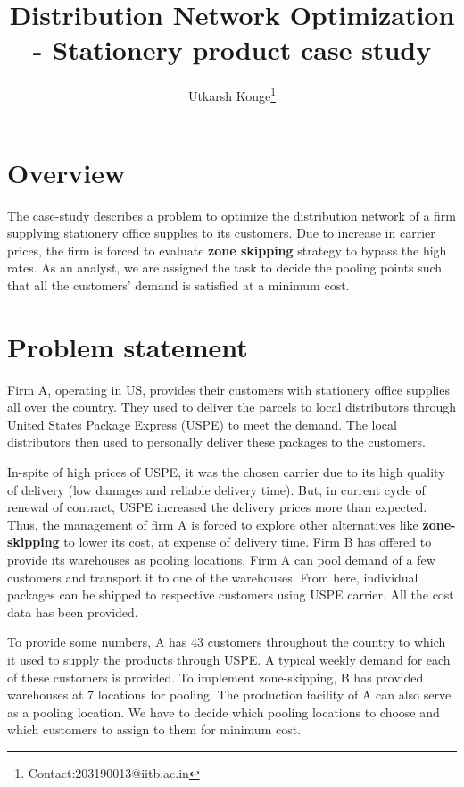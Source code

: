 \documentclass[11pt]{article}
\begin{document}
 
 
\title{Distribution Network Optimization - Stationery product case study }
\author{Utkarsh Konge\footnote{Contact:203190013@iitb.ac.in}}
\date{}
\maketitle

\section{Overview}
The case-study \cite{drake2011case} describes a problem to optimize the distribution network of a firm supplying stationery office supplies to its customers. Due to increase in carrier prices, the firm is forced to evaluate \textbf{zone skipping} strategy to bypass the high rates. As an analyst, we are assigned the task to decide the pooling points such that all the customers' demand is satisfied at a minimum cost.

\section{Problem statement}
Firm A, operating in US, provides their customers with stationery office supplies all over the country. They used to deliver the parcels to local distributors through United States Package Express (USPE) to meet the demand. The local distributors then used to personally deliver these packages to the customers. 

In-spite of high prices of USPE, it was the chosen carrier due to its high quality of delivery (low damages and reliable delivery time). But, in current cycle of renewal of contract, USPE increased the delivery prices more than expected. Thus, the management of firm A is forced to explore other alternatives like \textbf{zone-skipping} to lower its cost, at expense of delivery time. Firm B has offered to provide its warehouses as pooling locations. Firm A can pool demand of a few customers and transport it to one of the warehouses. From here, individual packages can be shipped to respective customers using USPE carrier. All the cost data has been provided.

To provide some numbers, A has 43 customers throughout the country to which it used to supply the products through USPE. A typical weekly demand for each of these customers is provided. To implement zone-skipping, B has provided warehouses at 7 locations for pooling. The production facility of A can also serve as a pooling location. We have to decide which pooling locations to choose and which customers to assign to them for minimum cost. 
\end{document}
